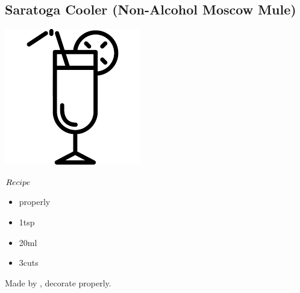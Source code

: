 \subsection{Saratoga Cooler (Non-Alcohol Moscow Mule)}
\vspace{-7.4mm}
\hspace{106mm}
\includegraphics[scale=.07]{cocktail_glass_tall.png}
\vspace{2.5mm}
\begin{itembox}[l]{\boldmath $Recipe$}
\begin{itemize}
\setlength{\parskip}{0cm}
\setlength{\itemsep}{0cm}
\item \ga properly
\item \gumsyrup 1tsp
\item \limj 20ml
\item \lime 3cuts
\end{itemize}
\vspace{-4mm}
Made by \build, decorate \lime properly.
\end{itembox}

